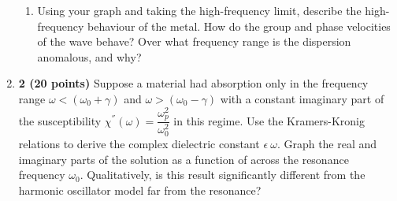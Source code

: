 \documentclass[fleqn]{article}
\begin{document}
\begin{enumerate}
\begin{enumerate}

      \item Using your graph and taking the high-frequency limit, describe the high-frequency behaviour
      of the metal. How do the group and phase velocities of the wave behave? Over what frequency
      range is the dispersion anomalous, and why?


    \end{enumerate}
    

    \item \textbf{2 (20 points)} Suppose a material had absorption only in the frequency range $\omega < \left(\omega_0+\gamma\right)$
    and $\omega > \left(\omega_0-\gamma\right)$ with a constant imaginary part of the susceptibility $\chi^{''}(\omega)=\dfrac{\omega_p^2}{\omega_0^2}$ 
    in this regime. Use the Kramers-Kronig relations to derive the complex dielectric constant $\epsilon ~ \omega$. Graph the real and imaginary parts of the
    solution as a function of across the resonance frequency $\omega_0$. Qualitatively, is this result significantly
    different from the harmonic oscillator model far from the resonance?


  \end{enumerate}
\end{document}
